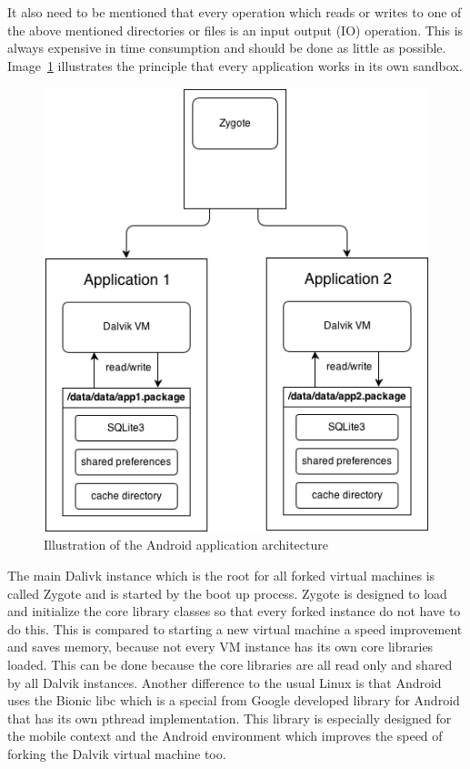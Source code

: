It also need to be mentioned that every operation which reads or writes to one of the above mentioned directories or files is an input output (IO) operation.
This is always expensive in time consumption and should be done as little as possible.
Image~\ref{fig:zygote-and-app} illustrates the principle that every application works in its own sandbox.\\
\begin{figure}[h]
\begin{center}
\includegraphics[scale=0.65]{images/zygote-and-app.png} 
\caption{Illustration of the Android application architecture}
\label{fig:zygote-and-app}
\end{center}
\end{figure}
The main Dalivk instance which is the root for all forked virtual machines is called Zygote and is started by the boot up process.
Zygote is designed to load and initialize the core library classes so that every forked instance do not have to do this.
This is compared to starting a new virtual machine a speed improvement and saves memory, because not every VM instance has its own core libraries loaded.
This can be done because the core libraries are all read only and shared by all Dalvik instances.\cite{ehringer2010dalvik}
Another difference to the usual Linux is that Android uses the Bionic libc which is a special from Google developed library for Android that has its own pthread implementation.
This library is especially designed for the mobile context and the Android environment which improves the speed of forking the Dalvik virtual machine too.~\cite{brady2008android}

